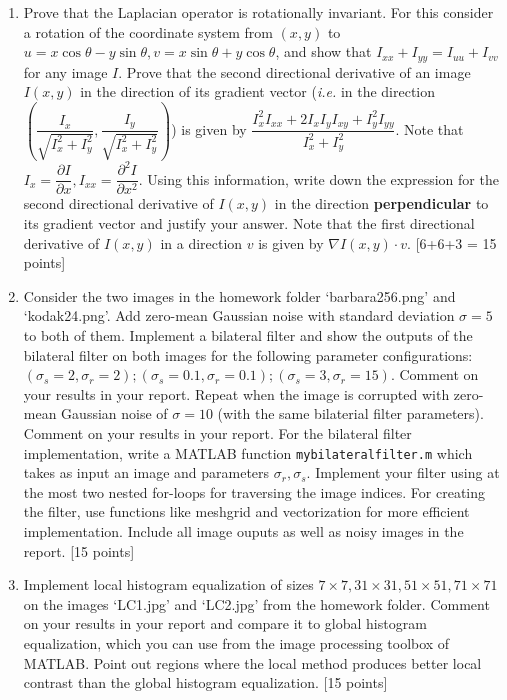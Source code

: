 \documentclass[11pt]{article}
\begin{document}
\begin{enumerate}
\item Prove that the Laplacian operator is rotationally invariant. For this consider a rotation of the coordinate system from $(x,y)$ to $u = x \cos \theta - y \sin \theta, v = x \sin \theta + y \cos \theta$, and show that $I_{xx} + I_{yy} = I_{uu} + I_{vv}$ for any image $I$. 
Prove that the second directional derivative of an image $I(x,y)$ in the direction of its gradient vector (\textit{i.e.} in the direction $(\dfrac{I_x}{\sqrt{I^2_x+I^2_y}},\dfrac{I_y}{\sqrt{I^2_x+I^2_y}})$) is given by $\dfrac{I^2_x I_{xx} + 2 I_x I_y I_{xy} + I^2_y I_{yy}}{I^2_x + I^2_y}$. Note that $I_x = \dfrac{\partial I}{\partial x}, I_{xx} = \dfrac{\partial^2 I}{\partial x^2}$. Using this information, write down the expression for the second directional derivative of $I(x,y)$ in the direction \textbf{perpendicular} to its gradient vector and justify your answer. Note that the first directional derivative of $I(x,y)$ in a direction $v$ is given by $\nabla I(x,y) \cdot v$. \textsf{[6+6+3 = 15 points]}


\item Consider the two images in the homework folder `barbara256.png' and `kodak24.png'. Add zero-mean Gaussian noise with standard deviation $\sigma = 5$ to both of them. Implement a bilateral filter and show the outputs of the bilateral filter on both images for the following parameter configurations: $(\sigma_s = 2, \sigma_r = 2); (\sigma_s = 0.1, \sigma_r = 0.1); (\sigma_s = 3, \sigma_r = 15)$. Comment on your results in your report. Repeat when the image is corrupted with zero-mean Gaussian noise of $\sigma = 10$ (with the same bilaterial filter parameters). Comment on your results in your report. For the bilateral filter implementation, write a MATLAB function \texttt{mybilateralfilter.m} which takes as input an image and parameters $\sigma_r, \sigma_s$. Implement your filter using at the most two nested for-loops for traversing the image indices. For creating the filter, use functions like meshgrid and vectorization for more efficient implementation. Include all image ouputs as well as noisy images in the report. \textsf{[15 points]}

\item Implement local histogram equalization of sizes $7 \times 7, 31 \times 31, 51 \times 51, 71 \times 71$ on the images `LC1.jpg' and `LC2.jpg' from the homework folder. Comment on your results in your report and compare it to global histogram equalization, which you can use from the image processing toolbox of MATLAB. Point out regions where the local method produces better local contrast than the global histogram equalization. \textsf{[15 points]}

\end{enumerate}
\end{document}
